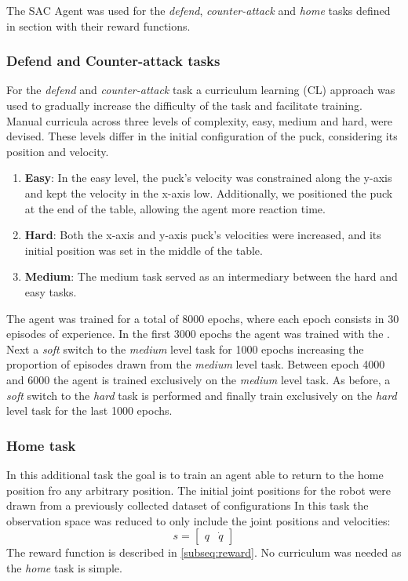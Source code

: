 The SAC Agent was used for the \textit{defend}, \textit{counter-attack} and \textit{home} tasks defined in section \label{subsec:reward} with their reward functions.

\subsubsection{Defend and Counter-attack tasks}
For the \textit{defend} and \textit{counter-attack} task a curriculum learning (CL) \cite{CL} approach was used to gradually increase the difficulty of the task and facilitate training.
Manual curricula across three levels of complexity, easy, medium and hard, were devised. These levels differ in the initial configuration of the puck, considering its position and velocity.

\begin{enumerate}
    \item \textbf{Easy}: In the easy level, the puck's velocity was constrained along the y-axis and kept the velocity in the x-axis low.
    Additionally, we positioned the puck at the end of the table, allowing the agent more reaction time.
    \item \textbf{Hard}: Both the x-axis and y-axis puck's velocities were increased, and its initial position was set in the middle of the table.
    \item \textbf{Medium}: The medium task served as an intermediary between the hard and easy tasks.
\end{enumerate}

The agent was trained for a total of 8000 epochs, where each epoch consists in 30 episodes of experience. In the first 3000 epochs the agent was trained with the . Next a
\textit{soft} switch to the \textit{medium} level task for 1000 epochs increasing the proportion of episodes drawn from the \textit{medium} level task. Between epoch 4000 and 6000 the agent is trained
exclusively on the \textit{medium} level task. As before, a \textit{soft} switch to the \textit{hard} task is performed and finally train exclusively on the \textit{hard} level task for the last 1000 epochs.

\subsubsection{Home task}
In this additional task the goal is to train an agent able to return to the home position fro any arbitrary position.
The initial joint positions for the robot were drawn from a previously collected dataset of configurations 
In this  task the observation space was reduced to only include the joint positions and velocities:
\begin{equation*}
    s = \begin{bmatrix} q & \dot{q} \end{bmatrix}
\end{equation*}
The reward function is described in \ref{subseq:reward}.
No curriculum was needed as the \textit{home} task is simple.
